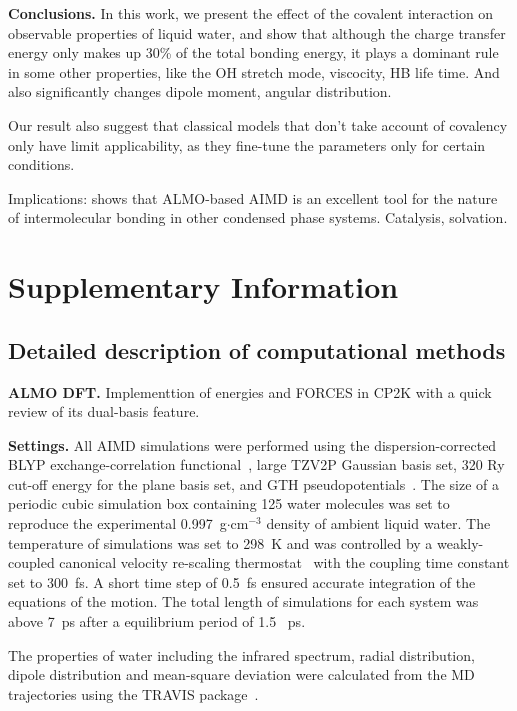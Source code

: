 \documentclass[aps,prl,reprint,amsmath,amssymb]{revtex4-1}
\begin{document}
\textbf{Conclusions.} In this work, we present the effect of the covalent interaction on observable properties of liquid water, and show that although the charge transfer energy only makes up 30\% of the total bonding energy, it plays a dominant rule in some other properties, like the OH stretch mode, viscocity, HB life time. And also significantly changes dipole moment, angular distribution. 
 
Our result also suggest that classical models that don't take account of covalency only have limit applicability, as they fine-tune the parameters only for certain conditions.
 
Implications: shows that ALMO-based AIMD is an excellent tool for the nature of intermolecular bonding in other condensed phase systems. Catalysis, solvation.

\section{Supplementary Information}

\subsection{Detailed description of computational methods}

\textbf{ALMO DFT.} Implementtion of energies and FORCES in CP2K with a quick review of its dual-basis feature.

\textbf{Settings.} All AIMD simulations were performed using the dispersion-corrected~\cite{grimme2010consistent} BLYP exchange-correlation functional~\cite{becke1988density}, large TZV2P Gaussian basis set, 320 Ry cut-off energy for the plane basis set, and GTH pseudopotentials~\cite{goedecker1996separable,krack2005pseudopotentials}. The size of a periodic cubic simulation box containing 125 water molecules was set to reproduce the experimental 0.997~g$\cdot$cm$^{-3}$ density of ambient liquid water. The temperature of simulations was set to 298~K and was controlled by a weakly-coupled canonical velocity re-scaling thermostat~\cite{bussi2007canonical} with the coupling time constant set to 300~fs. A short time step of 0.5~fs ensured accurate integration of the equations of the motion. The total length of simulations for each system was above 7~ps after a equilibrium period of 1.5 ~ps.

The properties of water including the infrared spectrum, radial distribution, dipole distribution and mean-square deviation were calculated from the MD trajectories using the TRAVIS package~\cite{brehm2012travis}.  
\end{document}

